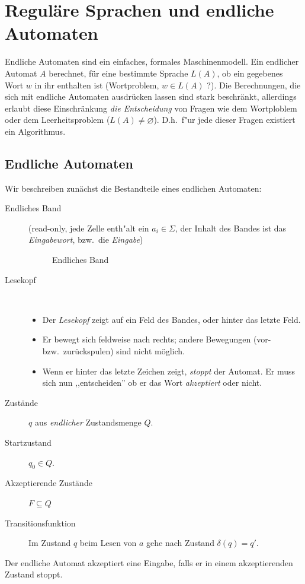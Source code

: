 \section[Reguläre Sprachen und endliche Automaten]{Reguläre Sprachen und endliche Automaten}
Endliche Automaten sind ein einfaches, formales Maschinenmodell.
Ein endlicher Automat $A$ berechnet, für eine bestimmte Sprache $L(A)$, ob ein gegebenes Wort $w$ in ihr enthalten ist (Wortproblem, $w \in L(A)$ ?).
Die Berechnungen, die sich mit endliche Automaten ausdrücken lassen sind stark beschränkt, allerdings erlaubt diese Einschränkung \emph{die Entscheidung} von Fragen wie dem Wortploblem oder dem Leerheitsproblem ($L(A)\neq\varnothing$).
D.h.\ f"ur jede dieser Fragen existiert ein Algorithmus.

\subsection{Endliche Automaten}
Wir beschreiben zunächst die Bestandteile eines endlichen Automaten:


\begin{description}
\item[Endliches Band] 
(read-only, jede Zelle enth"alt ein $a_i\in\Sigma$, der Inhalt des Bandes ist das \emph{Eingabewort}, bzw.\ die \emph{Eingabe})

\begin{figure}[H]\centering
	\caption{Endliches Band}
\end{figure}
\vspace{-1em}
\item[Lesekopf] ~\\
  \vspace{-\baselineskip}
  \begin{itemize}
	\item Der \emph{Lesekopf} zeigt auf ein Feld des Bandes, oder hinter das letzte Feld.
	\item Er bewegt sich feldweise nach rechts; andere Bewegungen (vor- bzw.\ zurückspulen) sind nicht möglich.
	\item Wenn er hinter das letzte Zeichen zeigt, \emph{stoppt} der Automat.
    Er muss sich nun ,,entscheiden'' ob er das Wort \emph{akzeptiert} oder nicht.
  \end{itemize}
\item[Zustände] $q$ aus \emph{endlicher} Zustandsmenge $Q$.
\item[Startzustand] $q_0 \in Q$.
\item[Akzeptierende Zustände] $F \subseteq Q$ 
\item[Transitionsfunktion] Im Zustand $q$ beim Lesen von $a$ gehe nach Zustand $\delta(q) = q'$.
\end{description}
Der endliche Automat akzeptiert eine Eingabe, falls er in einem akzeptierenden Zustand stoppt.

